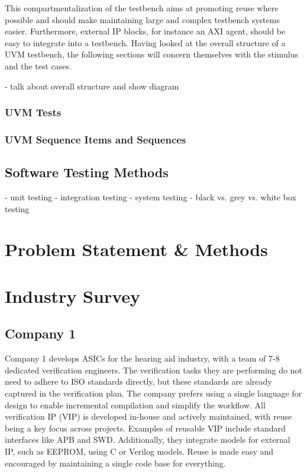 \documentclass[12pt]{book}
\begin{document}
This compartmentalization of the testbench aims at promoting reuse where possible and should make maintaining large and complex testbench systems easier. Furthermore, external IP blocks, for instance an AXI agent, should be easy to integrate into a testbench. Having looked at the overall structure of a UVM testbench, the following sections will concern themselves with the stimulus and the test cases.

- talk about overall structure and show diagram

\subsection{UVM Tests}

\subsection{UVM Sequence Items and Sequences}

\section{Software Testing Methods} %
- unit testing
- integration testing
- system testing
- black vs. grey vs. white box testing

\chapter{Problem Statement \& Methods} %




\chapter{Industry Survey} %

\section{Company 1}

Company 1 develops ASICs for the hearing aid industry, with a team of 7-8 dedicated verification engineers. The verification tasks they are performing do not need to adhere to ISO standards directly, but these standards are already captured in the verification plan. The company prefers using a single language for design to enable incremental compilation and simplify the workflow. All verification IP (VIP) is developed in-house and actively maintained, with reuse being a key focus across projects. Examples of reusable VIP include standard interfaces like APB and SWD. Additionally, they integrate models for external IP, such as EEPROM, using C or Verilog models. Reuse is made easy and encouraged by maintaining a single code base for everything.
\end{document}
